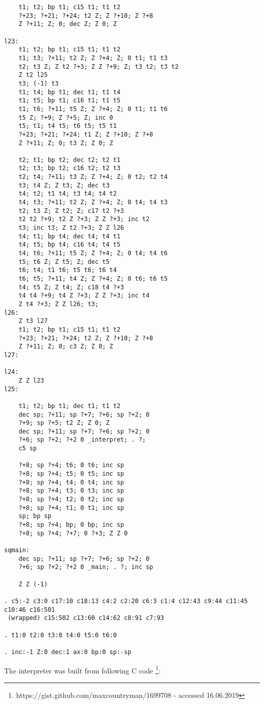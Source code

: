 \documentclass{article}
\begin{document}
\begin{verbatim}
	t1; t2; bp t1; c15 t1; t1 t2
	?+23; ?+21; ?+24; t2 Z; Z ?+10; Z ?+8
	Z ?+11; Z; 0; dec Z; Z 0; Z

l23:
	t1; t2; bp t1; c15 t1; t1 t2
	t1; t3; ?+11; t2 Z; Z ?+4; Z; 0 t1; t1 t3
	t2; t3 Z; Z t2 ?+3; Z Z ?+9; Z; t3 t2; t3 t2
	Z t2 l25
	t3; (-1) t3
	t1; t4; bp t1; dec t1; t1 t4
	t1; t5; bp t1; c16 t1; t1 t5
	t1; t6; ?+11; t5 Z; Z ?+4; Z; 0 t1; t1 t6
	t5 Z; ?+9; Z ?+5; Z; inc 0
	t5; t1; t4 t5; t6 t5; t5 t1
	?+23; ?+21; ?+24; t1 Z; Z ?+10; Z ?+8
	Z ?+11; Z; 0; t3 Z; Z 0; Z

	t2; t1; bp t2; dec t2; t2 t1
	t2; t3; bp t2; c16 t2; t2 t3
	t2; t4; ?+11; t3 Z; Z ?+4; Z; 0 t2; t2 t4
	t3; t4 Z; Z t3; Z; dec t3
	t4; t2; t1 t4; t3 t4; t4 t2
	t4; t3; ?+11; t2 Z; Z ?+4; Z; 0 t4; t4 t3
	t2; t3 Z; Z t2; Z; c17 t2 ?+3
	t2 t2 ?+9; t2 Z ?+3; Z Z ?+3; inc t2
	t3; inc t3; Z t2 ?+3; Z Z l26
	t4; t1; bp t4; dec t4; t4 t1
	t4; t5; bp t4; c16 t4; t4 t5
	t4; t6; ?+11; t5 Z; Z ?+4; Z; 0 t4; t4 t6
	t5; t6 Z; Z t5; Z; dec t5
	t6; t4; t1 t6; t5 t6; t6 t4
	t6; t5; ?+11; t4 Z; Z ?+4; Z; 0 t6; t6 t5
	t4; t5 Z; Z t4; Z; c18 t4 ?+3
	t4 t4 ?+9; t4 Z ?+3; Z Z ?+3; inc t4
	Z t4 ?+3; Z Z l26; t3;
l26:
	Z t3 l27
	t1; t2; bp t1; c15 t1; t1 t2
	?+23; ?+21; ?+24; t2 Z; Z ?+10; Z ?+8
	Z ?+11; Z; 0; c3 Z; Z 0; Z
l27:

l24:
	Z Z l23
l25:

	t1; t2; bp t1; dec t1; t1 t2
	dec sp; ?+11; sp ?+7; ?+6; sp ?+2; 0
	?+9; sp ?+5; t2 Z; Z 0; Z
	dec sp; ?+11; sp ?+7; ?+6; sp ?+2; 0
	?+6; sp ?+2; ?+2 0 _interpret; . ?;
	c5 sp

	?+8; sp ?+4; t6; 0 t6; inc sp
	?+8; sp ?+4; t5; 0 t5; inc sp
	?+8; sp ?+4; t4; 0 t4; inc sp
	?+8; sp ?+4; t3; 0 t3; inc sp
	?+8; sp ?+4; t2; 0 t2; inc sp
	?+8; sp ?+4; t1; 0 t1; inc sp
	sp; bp sp
	?+8; sp ?+4; bp; 0 bp; inc sp
	?+8; sp ?+4; ?+7; 0 ?+3; Z Z 0

sqmain:
	dec sp; ?+11; sp ?+7; ?+6; sp ?+2; 0
	?+6; sp ?+2; ?+2 0 _main; . ?; inc sp

	Z Z (-1)

. c5:-2 c3:0 c17:10 c18:13 c4:2 c2:20 c6:3 c1:4 c12:43 c9:44 c11:45 c10:46 c16:501
 (wrapped) c15:502 c13:60 c14:62 c8:91 c7:93

. t1:0 t2:0 t3:0 t4:0 t5:0 t6:0

. inc:-1 Z:0 dec:1 ax:0 bp:0 sp:-sp

\end{verbatim}

\par The interpreter was built from following C code \footnote{https://gist.github.com/maxcountryman/1699708 - accessed 16.06.2019}:
\end{document}
